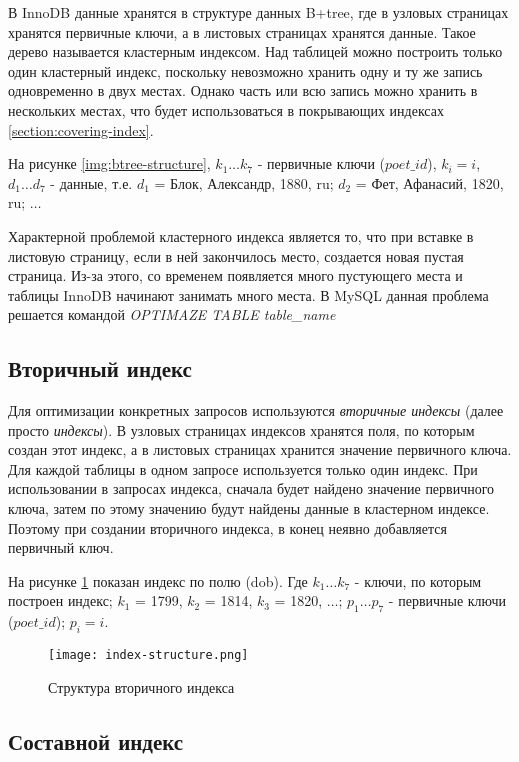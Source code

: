 В InnoDB данные хранятся в структуре данных B+tree, где в узловых страницах хранятся первичные ключи, а в листовых страницах хранятся данные. Такое дерево называется кластерным индексом. Над таблицей можно построить только один кластерный индекс, поскольку невозможно хранить одну и ту же запись одновременно в двух местах. Однако часть или всю запись можно хранить в нескольких местах, что будет использоваться в покрывающих индексах \ref{section:covering-index}.

На рисунке \ref{img:btree-structure}, $k_1 \ldots k_7$ - первичные ключи ($poet\_id$), $k_i = i$, $d_1 \ldots d_7$ - данные, т.е. $d_1$ = Блок, Александр, 1880, ru; $d_2$ = Фет, Афанасий, 1820, ru; $\ldots$

Характерной проблемой кластерного индекса является то, что при вставке в листовую страницу, если в ней закончилось место, создается новая пустая страница. Из-за этого, со временем появляется много пустующего места и таблицы InnoDB начинают занимать много места. В MySQL данная проблема решается командой \textit{OPTIMAZE TABLE table_name}

\subsection{Вторичный индекс}

Для оптимизации конкретных запросов используются \textit{вторичные индексы} (далее просто \textit{индексы}). В узловых страницах индексов хранятся поля, по которым создан этот индекс, а в листовых страницах хранится значение первичного ключа. Для каждой таблицы в одном запросе используется только один индекс. При использовании в запросах индекса, сначала будет найдено значение первичного ключа, затем по этому значению будут найдены данные в кластерном индексе. Поэтому при создании вторичного индекса, в конец неявно добавляется первичный ключ.

На рисунке \ref{img:index-structure} показан индекс по полю (dob). Где $k_1 \ldots k_7$ - ключи, по которым построен индекс; $k_1$ = 1799, $k_2$ = 1814, $k_3$ = 1820, $\ldots$; $p_1 \ldots p_7$ - первичные ключи ($poet\_id$); $p_i = i$.

\begin{figure}[H]
  \centering
  \texttt{[image: index-structure.png]}
  \caption{Структура вторичного индекса}
  \label{img:index-structure}
\end{figure}

\subsection{Составной индекс}


